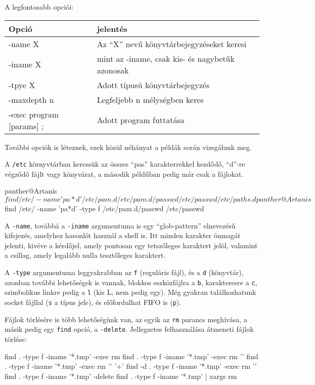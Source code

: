 A legfontosabb opciói:

\begin{tabular}{ll}\toprule
Opció  & jelentés\\\midrule
-name X & Az ``X'' nevű könyvtárbejegyzéseket keresi\\
-iname X & mint az -iname, csak kis- és nagybetűk azonosak\\
-tpye X & Adott típusú könyvtárbejegyzés\\
-maxdepth n & Legfeljebb n mélységben keres\\
-exec program [params] ; & Adott program futtatása\\%
\bottomrule
\end{tabular}

További opciók is léteznek, ezek közül néhányat a példák során vizsgálunk meg.

A \texttt{/etc} környvtárban keressük az összes ``pas'' karakterrekkel kezdődő,
``d''-re végződő fájlt vagy könyvárat, a második példűban pedig már csak a
fájlokat.

\begin{VerbExample}
panther@Artanis ~ $ find  /etc/ -name 'pa*d'
/etc/pam.d
/etc/pam.d/passwd
/etc/passwd
/etc/paths.d
panther@Artanis ~ $ find  /etc/ -name 'pa*d' -type f
/etc/pam.d/passwd
/etc/passwd
\end{VerbExample}

A \texttt{-name}, továbbá a \texttt{-iname} argumentuma is egy ``glob-pattern''
elnevezésű kifejezés, amelyhez hasonlót használ a shell is. Itt minden karakter
önmagát jelenti, kivéve a kérdőjel, amely pontosan egy tetszőleges karaktert
jelöl, valamint a csillag, amely legalább nulla tesztőleges karaktert. 

A \texttt{-type} argumentuma leggyakrabban az \texttt{f} (reguláris fájl), és a
\texttt{d} (könyvtár), azonban további lehetőségek is vannak, blokkos
eszközfájlra a \texttt{b}, karakteresre a \texttt{c}, szimbolikus linkre pedig a
\texttt{l} (kis L, nem pedig egy). Még gyakran találkozhatunk socket fájllal
(\texttt{s} a típus jele), és előfordulhat FIFO is (\texttt{p}). 

Fájlok törlésére is több lehetőségünk van, az egyik az \texttt{rm} parancs
meghívása, a másik pedig egy \texttt{find} opció, a
\texttt{-delete}. Jellegzetes felhasználása átmeneti fájlok törlése:

\begin{VerbExampleNum}
find . -type f -iname '*.tmp' -exec rm {} \;
find . -type f -iname '*.tmp' -exec rm '{}' \;
find . -type f -iname '*.tmp' -exec rm '{}' '+'
find -d . -type f -iname '*.tmp' -exec rm '{}' \;
find . -type f -iname '*.tmp' -delete
find . -type f -iname '*.tmp' | xargs rm
\end{VerbExampleNum}

